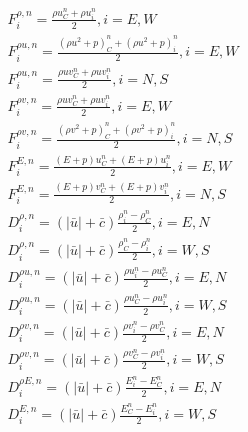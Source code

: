 \documentclass{article}
\begin{document}
\begin{equation}
    \begin{split}
        F^{\rho , n }_{i}=\frac{\rho u^{n}_{C}+\rho u^{n}_{i}}{2}, i=E,W \\
        F^{\rho u, n }_{i}=\frac{(\rho u^{2}+p)^n_{C}+(\rho u^{2}+p)^n_{i}}{2}, i=E,W \\
         F^{\rho u, n }_{i}=\frac{\rho u v^{n}_{C}+\rho u v^{n}_{i}}{2}, i=N,S\\
          F^{\rho v, n }_{i}=\frac{\rho u v^{n}_{C}+\rho u v^{n}_{i}}{2}, i=E,W \\
          F^{\rho v, n }_{i}=\frac{(\rho v^{2}+p)^n_{C}+(\rho v^{2}+p)^n_{i}}{2}, i=N,S \\
          F^{E, n }_{i}=\frac{(E+p) u^n_{C}+(E+p) u^n_{i}}{2}, i=E,W \\
          F^{E, n }_{i}=\frac{(E+p) v^n_{C}+(E+p) v^n_{i}}{2}, i=N,S \\
          D^{\rho , n }_{i}=(| \bar{u}|+\bar{c}) \frac{\rho^{n}_{i}-\rho^{n}_{C}}{2},i=E,N\\
          D^{\rho , n }_{i}=(| \bar{u}|+\bar{c}) \frac{\rho^{n}_{C}-\rho^{n}_{i}}{2},i=W,S\\
          D^{\rho u, n }_{i}=(| \bar{u}|+\bar{c}) \frac{\rho u^{n}_{i}-\rho u^{n}_{C}}{2},i=E,N\\
           D^{\rho u, n }_{i}=(| \bar{u}|+\bar{c}) \frac{\rho u^{n}_{C}-\rho u^{n}_{i}}{2},i=W,S\\
            D^{\rho v, n }_{i}=(| \bar{u}|+\bar{c} )\frac{\rho v^{n}_{i}-\rho v^{n}_{C}}{2},i=E,N\\
             D^{\rho v, n }_{i}=(| \bar{u}|+\bar{c} ) \frac{\rho v^{n}_{C}-\rho v^{n}_{i}}{2},i=W,S\\
              D^{\rho E, n }_{i}=(| \bar{u}|+\bar{c}) \frac{E^{n}_{i}-E^{n}_{C}}{2},i=E,N\\
               D^{E, n }_{i}=(| \bar{u}|+\bar{c}) \frac{E^{n}_{C}-E^{n}_{i}}{2},i=W,S\\
    \end{split}
\end{equation}
\end{document}
